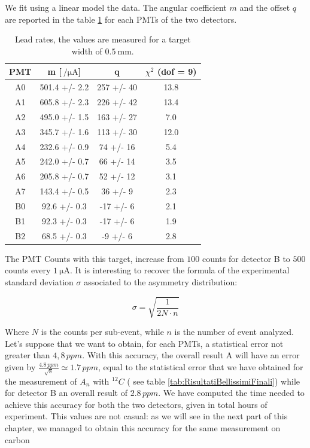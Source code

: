 We fit using a linear model the data. The angular coefficient $m$ and the offset $q$ are reported in the table \ref{tab:LeadRates} for each PMTs of the two detectors.  

\begin{table}[ht]
\centering
\begin{tabular}{cccc}
\hline
 PMT   & m [$\SI{}{ \per \micro \ampere}$]          & q                &  $\chi^{2}$ (dof = 9) \\
\hline
 A0    & 501.4 +/- 2.2 & 257 +/- 40 & 13.8  \\
 A1    & 605.8 +/- 2.3 & 226 +/- 42 & 13.4  \\
 A2    & 495.0 +/- 1.5 & 163 +/- 27 &  7.0  \\
 A3    & 345.7 +/- 1.6  & 113 +/- 30  & 12.0 \\
 A4    & 232.6 +/- 0.9  & 74 +/- 16  &  5.4 \\
 A5    & 242.0 +/- 0.7 & 66 +/- 14  &  3.5  \\
 A6    & 205.8 +/- 0.7 & 52 +/- 12  &  3.1  \\
 A7    & 143.4 +/- 0.5 & 36 +/- 9   &  2.3  \\
 B0    & 92.6 +/- 0.3  & -17 +/- 6  &  2.1  \\
 B1    & 92.3 +/- 0.3  & -17 +/- 6   &  1.9  \\
 B2    & 68.5 +/- 0.3  & -9 +/- 6   &  2.8  \\
\hline
\end{tabular}
\caption{Lead rates, the values are measured for a target width of $\SI{0.5}{\milli \meter}$.}
\label{tab:LeadRates}
\end{table}

The PMT Counts with this target, increase from $100$ counts for detector B to $500$ counts every $\SI{1}{\micro \ampere}$. It is interesting to recover the formula of the experimental standard deviation $\sigma$ associated to the asymmetry distribution:

\begin{equation}
\sigma = \sqrt{\dfrac{1}{2 N \cdot n}}
\end{equation}

Where $N$ is the counts per sub-event, while  $n$ is the number of event analyzed.
Let's suppose that we want to obtain, for each PMTs, a statistical error not greater than $4,8 \, ppm$. With this accuracy, the overall result A will have an error given by $\frac{4.8 \, ppm}{\sqrt{8}} \simeq 1.7 \, ppm$, equal to the statistical error that we have obtained for the measurement of $A_{n}$ with $^{12}C$ ( see table \ref{tab:RisultatiBellissimiFinali}) while for detector B an overall result of $2.8 \, ppm$.
We have computed the time needed to achieve this accuracy for both the two detectors, given in total hours of experiment. This values are not casual: as we will see in the next part of this chapter, we managed to obtain this accuracy for the same measurement on carbon  

